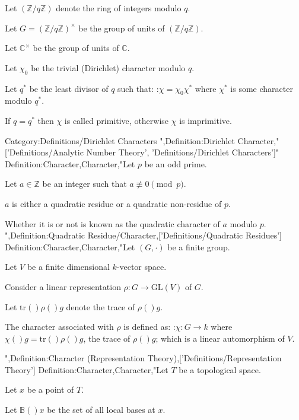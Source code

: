 Let $\left( \mathbb Z / q \mathbb Z \right)$ denote the ring of integers modulo $q$.

Let $G = \left( \mathbb Z / q \mathbb Z \right)^\times$ be the group of units of $\left( \mathbb Z / q \mathbb Z \right)$.

Let $\mathbb C^\times$ be the group of units of $\mathbb C$.


Let $\chi_0$ be the trivial (Dirichlet) character modulo $q$.

Let $q^*$ be the least divisor of $q$ such that:
:$\chi = \chi_0 \chi^*$
where $\chi^*$ is some character modulo $q^*$.

If $q = q^*$ then $\chi$ is called primitive, otherwise $\chi$ is imprimitive.



Category:Definitions/Dirichlet Characters
",Definition:Dirichlet Character,"['Definitions/Analytic Number Theory', 'Definitions/Dirichlet Characters']"
Definition:Character,Character,"Let $p$ be an odd prime.

Let $a \in \mathbb Z$ be an integer such that $a \not \equiv 0 \pmod p$.


$a$ is either a quadratic residue or a quadratic non-residue of $p$.

Whether it is or not is known as the quadratic character of $a$ modulo $p$.
",Definition:Quadratic Residue/Character,['Definitions/Quadratic Residues']
Definition:Character,Character,"Let $\left( G, \cdot \right)$ be a finite group.

Let $V$ be a finite dimensional  $k$-vector space.

Consider a linear representation $\rho: G \to \mathrm {GL} \left( V \right)$ of $G$.



Let $\mathrm {tr} \left(   \right){\rho \left(   \right)g}$ denote the trace of $\rho \left(   \right)g$.


The character associated with $\rho$ is defined as:
:$\chi: G \to k$
where $\chi \left(   \right)g = \mathrm {tr} \left(   \right){\rho \left(   \right)g}$, the trace of $\rho \left(   \right)g$; which is a linear automorphism of $V$.

",Definition:Character (Representation Theory),['Definitions/Representation Theory']
Definition:Character,Character,"Let $T$ be a topological space.

Let $x$ be a point of $T$.

Let $\mathbb B \left(   \right)x$ be the set of all local bases at $x$.


